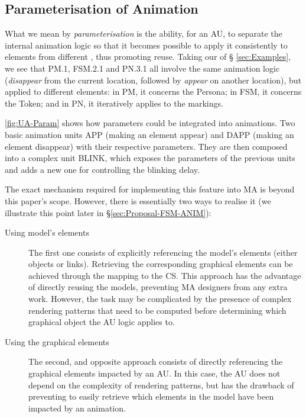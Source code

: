 \subsection{Parameterisation of Animation}
\label{sec:Param}

What we mean by \emph{parameterisation} is the ability, for an AU, to separate 
the internal animation logic so that it becomes possible to apply it consistently
to elements from different \DSLs, thus promoting reuse. Taking our \DSLs of \S 
\ref{sec:Examples}, we see that \textsf{PM.1}, \textsf{FSM.2.1} and \textsf{PN.3.1}
all involve the same animation logic (\emph{disappear} from the current location, 
followed by \emph{appear} on another location), but applied to different elements:
in \textsf{PM}, it concerns the \textsf{Persona}; in \textsf{FSM}, it concerns the
\textsf{Token}; and in \textsf{PN}, it iteratively applies to the markings.

\autoref{fig:UA-Param} shows how parameters could be integrated into animations. 
Two basic animation units \textsf{APP} (making an element appear) and \textsf{DAPP}
(making an element disappear) with their respective parameters. They are then
composed into a complex unit \textsf{BLINK}, which exposes the parameters of
the previous units and adds a new one for controlling the blinking delay.

The exact mechanism required for implementing this feature into MA is beyond this
paper's scope. However, there is essentially two ways to realise it (we illustrate
this point later in \S \ref{sec:Proposal-FSM-ANIM}):
\begin{description}
   \item[Using model's elements] The first one consists of explicitly referencing
   the model's elements (either objects or links). Retrieving the corresponding 
   graphical elements can be achieved through the mapping to the CS. This approach
   has the advantage of directly reusing the models, preventing MA designers from
   any extra work. However, the task may be complicated by the presence of complex
   rendering patterns that need to be computed before determining which graphical
   object the AU logic applies to.
   
   \item[Using the graphical elements] The second, and opposite approach consists
   of directly referencing the graphical elements impacted by an AU. In this case,
   the AU does not depend on the complexity of rendering patterns, but has the 
   drawback of preventing to easily retrieve which elements in the model have been
   impacted by an animation.
\end{description}

